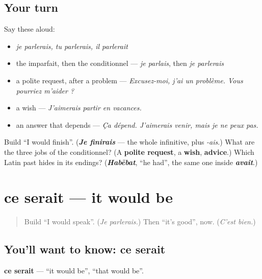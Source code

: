 \subsection*{Your turn}
Say these aloud:

\begin{itemize}
\raggedright
  \item \emph{je parlerais, tu parlerais, il parlerait}
  \item the imparfait, then the conditionnel — \emph{je parlais}, then \emph{je parlerais}
  \item a polite request, after a problem — \emph{Excusez-moi, j'ai un problème. Vous pourriez m'aider ?}
  \item a wish — \emph{J'aimerais partir en vacances.}
  \item an answer that depends — \emph{Ça dépend. J'aimerais venir, mais je ne peux pas.}
\end{itemize}

\begin{tcolorbox}[breakable,colback=teal!4,colframe=teal!35!black,title={Before you move on}]
Build \textquotedblleft{}I would finish\textquotedblright{}. (\emph{\textbf{Je finirais}} — the whole infinitive, plus \emph{-ais}.) What are the three jobs of the conditionnel? (A \textbf{polite request}, a \textbf{wish}, \textbf{advice}.) Which Latin past hides in its endings? (\emph{\textbf{Habēbat}}, \textquotedblleft{}he had\textquotedblright{}, the same one inside \emph{\textbf{avait}}.)
\end{tcolorbox}
\section[ce serait]{ce serait — it would be}

\label{lesson:FR-C267-ce-serait}



\begin{quote}
Build \textquotedblleft{}I would speak\textquotedblright{}. (\emph{Je parlerais.}) Then \textquotedblleft{}it's good\textquotedblright{}, now. (\emph{C'est bien.})
\end{quote}

\subsection*{You'll want to know: ce serait}
\textbf{ce serait} — \textquotedblleft{}it would be\textquotedblright{}, \textquotedblleft{}that would be\textquotedblright{}.

